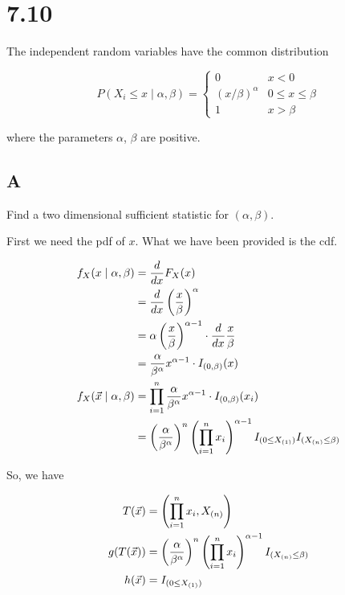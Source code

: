 \section{7.10}

The independent random variables \rs have the common distribution

\[
	P(X_i \leq x \mid \alpha, \beta) = \begin{cases}
		0 & x < 0 \\
		(x/\beta)^{\alpha} & 0 \leq x \leq \beta \\
		1 & x > \beta
	\end{cases}
\]

where the parameters $\alpha$, $\beta$ are positive. 

\subsection*{A}

Find a two dimensional sufficient statistic for $(\alpha, \beta)$.

First we need the pdf of $x$. What we have been provided is the cdf. 

\vspace{-2mm}
\begin{align*}
	f_X(x \mid \alpha, \beta) &= \frac{d}{dx} F_X(x) \\
	&= \frac{d}{dx} \left( \frac{x}{\beta} \right)^{\alpha} \\
	&= \alpha \left( \frac{x}{\beta} \right)^{\alpha - 1} \cdot \frac{d}{dx} \frac{x}{\beta} \\
	&= \frac{\alpha}{\beta^{\alpha}} x^{\alpha - 1} \cdot I_{(0, \beta)}(x) \\
	f_X(\vec{x} \mid \alpha, \beta) &= \prod_{i=1}^n \frac{\alpha}{\beta^{\alpha}} x^{\alpha - 1} \cdot I_{(0, \beta)}(x_i) \\
	&= \left( \frac{\alpha}{\beta^{\alpha}} \right)^n \left( \prod_{i=1}^n x_i \right)^{\alpha - 1} I_{(0 \leq X_{(1)})} I_{(X_{(n)} \leq \beta)}
\end{align*}

So, we have

\vspace{-2mm}
\begin{align*}
	T(\vec{x}) &= \left( \prod_{i=1}^n x_i, X_{(n)} \right) \\
	g(T(\vec{x})) &= \left( \frac{\alpha}{\beta^{\alpha}} \right)^n \left( \prod_{i=1}^n x_i \right)^{\alpha - 1} I_{(X_{(n)} \leq \beta)} \\
	h(\vec{x}) &= I_{(0 \leq X_{(1)})}
\end{align*}

